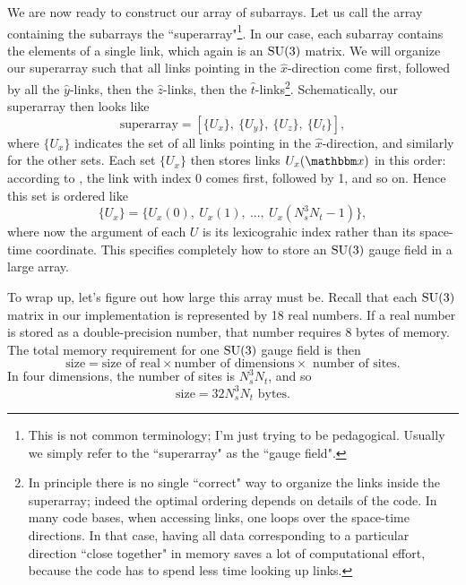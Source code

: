 We are now ready to construct our array of subarrays. Let us call the array
containing the subarrays the ``superarray"\footnote{This is not common
terminology; I'm just trying to be pedagogical. Usually we simply refer to the
``superarray" as the ``gauge field".}. In our case, each subarray contains
the elements of a single link, which again is an $\operatorname{SU}(3)$ matrix.
We will organize our superarray such that all links pointing in the
$\hat{x}$-direction come first, followed by all the $\hat{y}$-links, then the
$\hat{z}$-links, then the $\hat{t}$-links\footnote{In principle there is no 
single ``correct" way to organize the links inside the
superarray; indeed the optimal ordering depends on details of the code. In many
code bases, when accessing links, one loops over the space-time directions. In
that case, having all data corresponding to a particular direction ``close
together" in memory saves a lot of computational effort, because the code has to
spend less time looking up links.}. Schematically, our superarray then looks
like
\begin{equation}
  \text{superarray}=\left[\{U_x\},~\{U_y\},~\{U_z\},~\{U_t\}\right],
\end{equation}
where $\{U_x\}$ indicates the set of all links pointing in the
$\hat{x}$-direction, and similarly for the other sets.
Each set $\{U_x\}$ then stores links $U_x(\fvec{x})$ in this order: according to
, the link with index 0 comes first, followed by 1, and so
on. Hence this set is ordered like
\begin{equation}
\{U_x\} = \{ U_x(0),~U_x(1),~...,~U_x(N_s^3N_t-1)\},
\end{equation}
where now the argument of each $U$ is its lexicograhic index rather than its
space-time coordinate. This specifies completely how to store an $\operatorname{SU}(3)$ gauge
field in a large array.

To wrap up, let's figure out how large this array must be. Recall that each
$\operatorname{SU}(3)$ matrix in our implementation is represented by 18 real numbers.
If a real number is stored as a double-precision number, that number requires 8
bytes of memory. The total memory requirement for one $\operatorname{SU}(3)$ gauge field is then
\begin{equation}
\text{size}=\text{size of real}\times\text{number of dimensions}
             \times\text{ number of sites.}
\end{equation}
In four dimensions, the number of sites is $N_s^3N_t$, and so 
\begin{equation}\label{eq:latsize}
\text{size}=32N_s^3N_t\text{ bytes.}
\end{equation}

